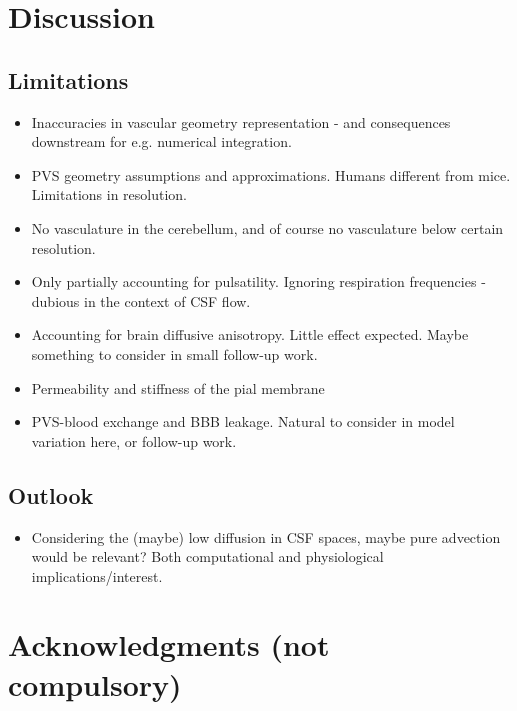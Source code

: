 \documentclass[fleqn,10pt]{wlscirep}
\begin{document}
\section*{Discussion}

\subsection*{Limitations}

\begin{itemize}
\item 
  Inaccuracies in vascular geometry representation - and consequences downstream for e.g. numerical integration.
\item
  PVS geometry assumptions and approximations. Humans different from mice. Limitations in resolution.
\item
  No vasculature in the cerebellum, and of course no vasculature below certain resolution.
\item
  Only partially accounting for pulsatility. Ignoring respiration frequencies - dubious in the context of CSF flow.
\item
  Accounting for brain diffusive anisotropy. Little effect expected. Maybe something to consider in small follow-up work.
\item
  Permeability and stiffness of the pial membrane
\item
  PVS-blood exchange and BBB leakage. Natural to consider in model variation here, or follow-up work.
\end{itemize}

\subsection*{Outlook}

\begin{itemize}
\item
  Considering the (maybe) low diffusion in CSF spaces, maybe pure
  advection would be relevant? Both computational and physiological
  implications/interest.
\end{itemize}



\newpage
\section*{Acknowledgments (not compulsory)}
\end{document}
